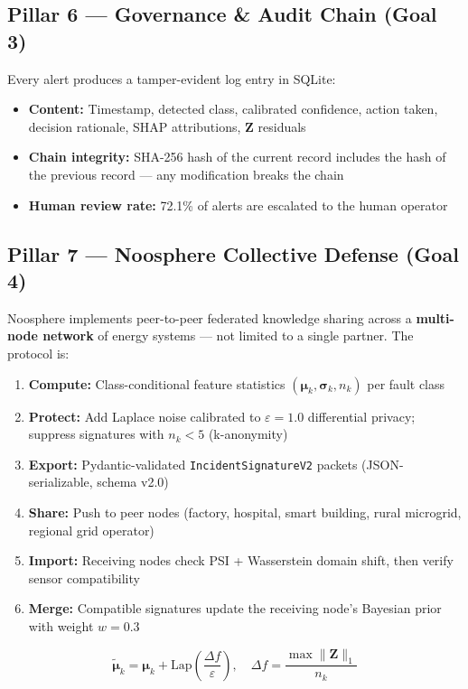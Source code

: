 \documentclass[12pt, a4paper]{article}
\begin{document}
\subsection{Pillar 6 — Governance \& Audit Chain (Goal 3)}

Every alert produces a tamper-evident log entry in SQLite:
\begin{itemize}
  \item \textbf{Content:} Timestamp, detected class, calibrated confidence, action taken, decision rationale, SHAP attributions, $\mathbf{Z}$ residuals
  \item \textbf{Chain integrity:} SHA-256 hash of the current record includes the hash of the previous record — any modification breaks the chain
  \item \textbf{Human review rate:} 72.1\% of alerts are escalated to the human operator
\end{itemize}

\subsection{Pillar 7 — Noosphere Collective Defense (Goal 4)}

Noosphere implements peer-to-peer federated knowledge sharing across a \textbf{multi-node network} of energy systems — not limited to a single partner. The protocol is:

\begin{enumerate}
  \item \textbf{Compute:} Class-conditional feature statistics $(\boldsymbol{\mu}_k, \boldsymbol{\sigma}_k, n_k)$ per fault class
  \item \textbf{Protect:} Add Laplace noise calibrated to $\varepsilon=1.0$ differential privacy; suppress signatures with $n_k < 5$ (k-anonymity)
  \item \textbf{Export:} Pydantic-validated \texttt{IncidentSignatureV2} packets (JSON-serializable, schema v2.0)
  \item \textbf{Share:} Push to peer nodes (factory, hospital, smart building, rural microgrid, regional grid operator)
  \item \textbf{Import:} Receiving nodes check PSI + Wasserstein domain shift, then verify sensor compatibility
  \item \textbf{Merge:} Compatible signatures update the receiving node's Bayesian prior with weight $w=0.3$
\end{enumerate}

\begin{equation}
\tilde{\boldsymbol{\mu}}_k = \boldsymbol{\mu}_k + \mathrm{Lap}\!\left(\frac{\Delta f}{\varepsilon}\right),\quad
\Delta f = \frac{\max\|\mathbf{Z}\|_1}{n_k}
\end{equation}
\end{document}
